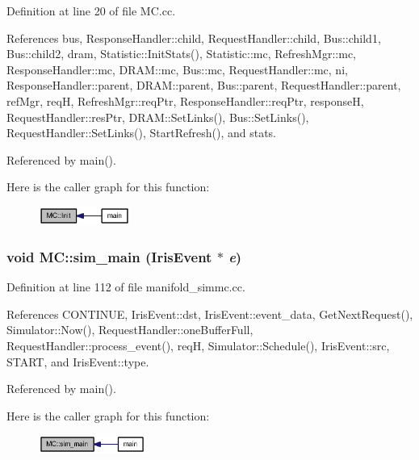 Definition at line 20 of file MC.cc.

References bus, ResponseHandler::child, RequestHandler::child, Bus::child1, Bus::child2, dram, Statistic::InitStats(), Statistic::mc, RefreshMgr::mc, ResponseHandler::mc, DRAM::mc, Bus::mc, RequestHandler::mc, ni, ResponseHandler::parent, DRAM::parent, Bus::parent, RequestHandler::parent, refMgr, reqH, RefreshMgr::reqPtr, ResponseHandler::reqPtr, responseH, RequestHandler::resPtr, DRAM::SetLinks(), Bus::SetLinks(), RequestHandler::SetLinks(), StartRefresh(), and stats.

Referenced by main().

Here is the caller graph for this function:\nopagebreak
\begin{figure}[H]
\begin{center}
\leavevmode
\includegraphics[width=85pt]{classMC_05109b1e9678c5d598027d7c47d7b2a4_icgraph}
\end{center}
\end{figure}
\subsubsection[{sim\_\-main}]{\setlength{\rightskip}{0pt plus 5cm}void MC::sim\_\-main ({\bf IrisEvent} $\ast$ {\em e})}\label{classMC_bf467a900cc11b932afd0e7432dd504c}




Definition at line 112 of file manifold\_\-simmc.cc.

References CONTINUE, IrisEvent::dst, IrisEvent::event\_\-data, GetNextRequest(), Simulator::Now(), RequestHandler::oneBufferFull, RequestHandler::process\_\-event(), reqH, Simulator::Schedule(), IrisEvent::src, START, and IrisEvent::type.

Referenced by main().

Here is the caller graph for this function:\nopagebreak
\begin{figure}[H]
\begin{center}
\leavevmode
\includegraphics[width=99pt]{classMC_bf467a900cc11b932afd0e7432dd504c_icgraph}
\end{center}
\end{figure}
